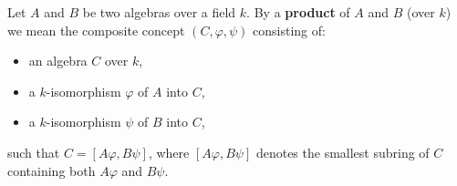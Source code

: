 Let $A$ and $B$ be two algebras over a field $k$. By a \textbf{product} of $A$ and $B$ (over $k$) we mean the composite concept $(C, \varphi, \psi)$ consisting of:
\begin{itemize}
\item an algebra $C$ over $k$,
\item a $k$-isomorphism $\varphi$ of $A$ into $C$,
\item a $k$-isomorphism $\psi$ of $B$ into $C$,
\end{itemize}
such that $C = [A\varphi, B\psi]$, where $[A\varphi, B\psi]$ denotes the smallest subring of $C$ containing both $A\varphi$ and $B\psi$.
